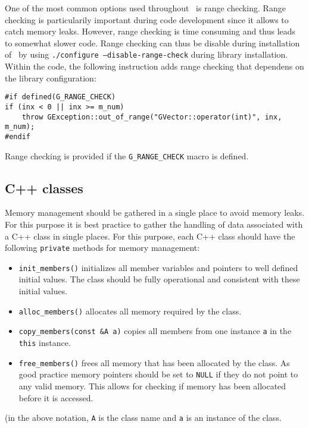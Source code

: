 \documentclass{article}[12pt,a4]
\begin{document}
One of the most common options used throughout \this\ is range checking.
Range checking is particularily important during code development since it allows to catch
memory leaks.
However, range checking is time consuming and thus leads to somewhat slower code.
Range checking can thus be disable during installation of \this\ by using
{\tt ./configure --disable-range-check} during library installation.
Within the code, the following instruction adds range checking that dependens on
the library configuration:

\begin{verbatim}
#if defined(G_RANGE_CHECK)
if (inx < 0 || inx >= m_num)
    throw GException::out_of_range("GVector::operator(int)", inx, m_num);
#endif
\end{verbatim}

Range checking is provided if the {\tt G\_RANGE\_CHECK} macro is defined.


\subsection{C++ classes}

Memory management should be gathered in a single place to avoid memory leaks.
For this purpose it is best practice to gather the handling of data associated with a C++
class in single places.
For this purpose, each C++ class should have the following {\tt private} methods
for memory management:
\begin{itemize}
\item {\tt init\_members()} initializes all member variables and pointers to well defined
initial values. The class should be fully operational and consistent with these initial
values.
\item {\tt alloc\_members()} allocates all memory required by the class. 
\item {\tt copy\_members(const \&A a)} copies all members from one instance {\tt a}
in the {\tt this} instance.
\item {\tt free\_members()} frees all memory that has been allocated by the class. As
good practice memory pointers should be set to {\tt NULL} if they do not point to
any valid memory. This allows for checking if memory has been allocated before
it is accessed.
\end{itemize}
(in the above notation, {\tt A} is the class name and {\tt a} is an instance of the class.


\end{document}
